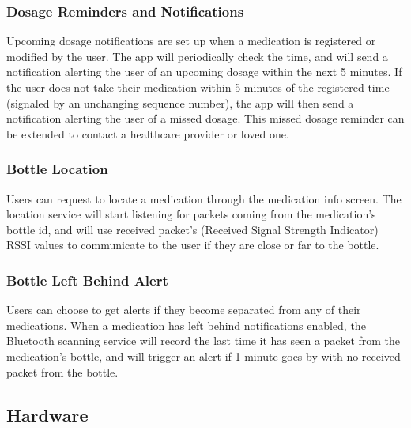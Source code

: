 \documentclass[sigconf]{acmart}
\begin{document}
\subsubsection{Dosage Reminders and Notifications}
Upcoming dosage notifications are set up when a medication is registered or modified by the user. The app will periodically check the time, and will send a notification alerting the user of an upcoming dosage within the next 5 minutes. If the user does not take their medication within 5 minutes of the registered time (signaled by an unchanging sequence number), the app will then send a notification alerting the user of a missed dosage. This missed dosage reminder can be extended to contact a healthcare provider or loved one.

\subsubsection{Bottle Location}
Users can request to locate a medication through the medication info screen. The location service will start listening for packets coming from the medication's bottle id, and will use received packet's (Received Signal Strength Indicator) RSSI values to communicate to the user if they are close or far to the bottle.

\subsubsection{Bottle Left Behind Alert}
Users can choose to get alerts if they become separated from any of their medications. When a medication has left behind notifications enabled, the Bluetooth scanning service will record the last time it has seen a packet from the medication's bottle, and will trigger an alert if 1 minute goes by with no received packet from the bottle.

\subsection{Hardware}
\end{document}
